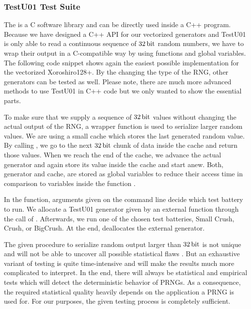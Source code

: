 \documentclass{stdlocal}
\begin{document}
    \subsubsection*{TestU01 Test Suite}
    The  is a C software library and can be directly used inside a C++ program.
    Because we have designed a C++ API for our vectorized generators and TestU01 is only able to read a continuous sequence of $32\, \mathrm{bit}$ random numbers, we have to wrap their output in a C-compatible way by using functions and global variables.
    The following code snippet shows again the easiest possible implementation for the vectorized Xoroshiro128+.
    By the changing the type of the RNG, other generators can be tested as well.
    Please note, there are much more advanced methods to use TestU01 in C++ code but we only wanted to show the essential parts.

    To make sure that we supply a sequence of $32\, \mathrm{bit}$ values without changing the actual output of the RNG, a wrapper function is used to serialize larger random values.
    We are using a small cache which stores the last generated random value.
    By calling , we go to the next $32\, \mathrm{bit}$ chunk of data inside the cache and return those values.
    When we reach the end of the cache, we advance the actual generator and again store its value inside the cache and start anew.
    Both, generator and cache, are stored as global variables to reduce their access time in comparison to  variables inside the function .

    In the  function, arguments given on the command line decide which test battery to run.
    We allocate a TestU01 generator given by an external function through the call of .
    Afterwards, we run one of the chosen test batteries, Small Crush, Crush, or BigCrush.
    At the end,  deallocates the external generator.

    The given procedure to serialize random output larger than $32\, \mathrm{bit}$ is not unique and will not be able to uncover all possible statistical flaws \autocite{oneill-blog-testu01}.
    But an exhaustive variant of testing is quite time-intensive and will make the results much more complicated to interpret.
    In the end, there will always be statistical and empirical tests which will detect the deterministic behavior of PRNGs.
    As a consequence, the required statistical quality heavily depends on the application a PRNG is used for.
    For our purposes, the given testing process is completely sufficient.
\end{document}

